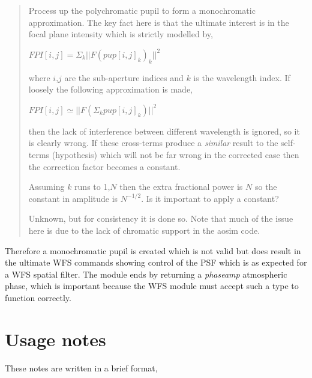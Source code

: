 \documentclass{article}
\begin{document}
\begin{quote}
      
Process up the polychromatic pupil to form a monochromatic approximation. The
key fact here is that the ultimate interest is in the focal plane intensity
which is strictly modelled by,

$FPI[i,j]=\Sigma_k{||F(pup[i,j]_k)_k||^2}$

where $i$,$j$ are the sub-aperture indices and $k$ is the wavelength index.  If
loosely the following approximation is made,

$FPI[i,j]\simeq{||F( \Sigma_k{pup[i,j]_k} )||^2}$

then the lack of interference between different wavelength is ignored, so it is
clearly wrong. If these cross-terms produce a {\it similar} result to the
self-terms (hypothesis) which will not be far wrong in the corrected case then
the correction factor becomes a constant.

Assuming $k$ runs to 1,$N$ then the extra fractional power is $N$ so the
constant in amplitude is $N^{-1/2}$. Is it important to apply a constant?

Unknown, but for consistency it is done so.  Note that much of the
issue here is due to the lack of chromatic support in the aosim code.
\end{quote}

Therefore a monochromatic pupil is created which is not valid but does result
in the ultimate WFS commands showing control of the PSF which is as expected
for a WFS spatial filter. The module ends by returning a {\it phaseamp }
atmospheric phase, which is important because the WFS module must accept such a
type to function correctly.

\section{Usage notes}

These notes are written in a brief format,
\end{document}
